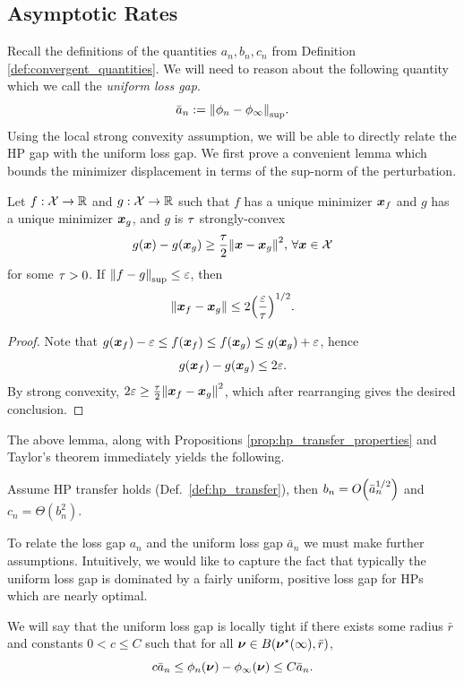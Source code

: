 \subsection{Asymptotic Rates}\label{app:asymptotic_rates}
Recall the definitions of the quantities $a_n, b_n, c_n$ from Definition \ref{def:convergent_quantities}. We will need to reason about the following quantity which we call the \textit{uniform loss gap}.
\begin{equation}\label{eq:uniform_loss_gap}
    \bar{a}_n := \norm{\phi_n - \phi_\infty}_{\mathrm{sup}}. 
\end{equation}
Using the local strong convexity assumption, we will be able to directly relate the HP gap with the uniform loss gap. We first prove a convenient lemma which bounds the minimizer displacement in terms of the sup-norm of the perturbation.
\begin{lemma}\label{lem:sc_unif_perturb}
    Let $f: \mathcal{X} \to \mathbb{R}$ and $g: \mathcal{X} \to \mathbb{R}$ such that $f$ has a unique minimizer ${\boldsymbol x}_f$ and $g$ has a unique minimizer ${\boldsymbol x}_g$, and $g$ is $\tau$ strongly-convex
    \[
        g({\boldsymbol x}) - g({\boldsymbol x}_g) \geq \frac{\tau}{2} \norm{{\boldsymbol x} - {\boldsymbol x}_g}^2,\, \forall {\boldsymbol x} \in \mathcal{X}
    \]
    for some $\tau > 0$. If $\norm{f - g}_{\mathrm{sup}} \leq \varepsilon$, then
    \[
        \norm{{\boldsymbol x}_f - {\boldsymbol x}_g} \leq 2 \qty(\frac{\varepsilon}{\tau})^{1 / 2}.
    \]
\end{lemma}
\begin{proof}
    Note that $g({\boldsymbol x}_f) - \varepsilon \leq f({\boldsymbol x}_f) \leq f({\boldsymbol x}_g) \leq g({\boldsymbol x}_g) + \varepsilon$, hence
    \[
        g({\boldsymbol x}_f) - g({\boldsymbol x}_g) \leq 2 \varepsilon.
    \]
    By strong convexity, $2 \varepsilon \geq \frac{\tau}{2} \norm{{\boldsymbol x}_f-{\boldsymbol x}_g}^2$, which after rearranging gives the desired conclusion.
\end{proof}
The above lemma, along with Propositions \ref{prop:hp_transfer_properties} and Taylor's theorem immediately yields the following.
\begin{lemma}\label{lem:basic_rate_unif}
    Assume HP transfer holds (Def.\ \ref{def:hp_transfer}), then $b_n = O\qty(\bar{a}_n^{1 / 2})$ and $c_n = \Theta(b_n^2)$.
\end{lemma}
To relate the loss gap $a_n$ and the uniform loss gap $\bar{a}_n$ we must make further assumptions. Intuitively, we would like to capture the fact that typically the uniform loss gap is dominated by a fairly uniform, positive loss gap for HPs which are nearly optimal.
\begin{definition}\label{def:locally_tight}
    We will say that the uniform loss gap is locally tight if there exists some radius $\bar{r}$ and constants $0 < c \leq C$ such that for all $\bm{\nu} \in B(\bm{\nu}^\star(\infty), \bar{r})$, 
\[
    c \bar{a}_n \leq \phi_n(\bm{\nu}) - \phi_\infty(\bm{\nu}) \leq C \bar{a}_n.
\]
\end{definition}
